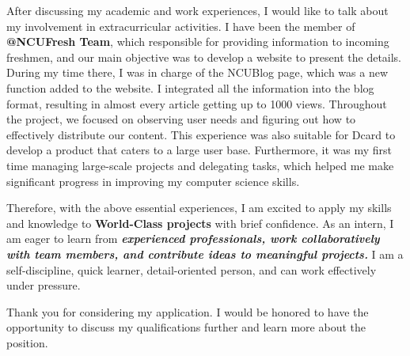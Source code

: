 After discussing my academic and work experiences, I would like to talk about my involvement in extracurricular activities. I have been the member of \textbf{@NCUFresh Team}, which responsible for providing information to incoming freshmen, and our main objective was to develop a website to present the details. During my time there, I was in charge of the NCUBlog page, which was a new function added to the website. I integrated all the information into the blog format, resulting in almost every article getting up to 1000 views. Throughout the project, we focused on observing user needs and figuring out how to effectively distribute our content. This experience was also suitable for Dcard to develop a product that caters to a large user base. Furthermore, it was my first time managing large-scale projects and delegating tasks, which helped me make significant progress in improving my computer science skills.


Therefore, with the above essential experiences, I am excited to apply my skills and knowledge to \textbf{World-Class projects} with brief confidence. As an intern, I am eager to learn from \textbf{\emph{experienced professionals, work collaboratively with team members, and contribute ideas to meaningful projects.}} I am a self-discipline, quick learner, detail-oriented person, and can work effectively under pressure.

Thank you for considering my application. I would be honored to have the opportunity to discuss my qualifications further and learn more about the position.